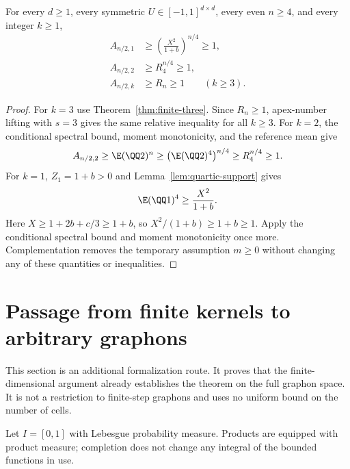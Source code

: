 \begin{theorem}
\label{thm:finite-main}
\proved For every $d\ge1$, every symmetric $U\in[-1,1]^{d\times d}$, every even $n\ge4$,
and every integer $k\ge1$,
\begin{align*}
 A_{n/2,1}&\ge\left(\frac{X^2}{1+b}\right)^{n/4}\ge1,\\
 A_{n/2,2}&\ge R_4^{n/4}\ge1,\\
 A_{n/2,k}&\ge R_n\ge1\qquad(k\ge3).
\end{align*}
\end{theorem}
\begin{proof}
For $k=3$ use Theorem~\ref{thm:finite-three}.  Since $R_n\ge1$, apex-number lifting with
$s=3$ gives the same relative inequality for all $k\ge3$.
For $k=2$, the conditional spectral bound, moment monotonicity, and the reference mean give
\[
 A_{n/2,2}\ge\E(\QQ2)^n
 \ge\bigl(\E(\QQ2)^4\bigr)^{n/4}\ge R_4^{n/4}\ge1.
\]
For $k=1$, $Z_1=1+b>0$ and Lemma~\ref{lem:quartic-support} gives
\[
 \E(\QQ1)^4\ge\frac{X^2}{1+b}.
\]
Here $X\ge1+2b+c/3\ge1+b$, so $X^2/(1+b)\ge1+b\ge1$.
Apply the conditional spectral bound and moment monotonicity once more.
Complementation removes the temporary assumption $m\ge0$ without changing any of these
quantities or inequalities.
\end{proof}

\section{Passage from finite kernels to arbitrary graphons}
\label{sec:approx}

This section is an additional formalization route.  It proves that the finite-dimensional
argument already establishes the theorem on the full graphon space.  It is not a restriction
to finite-step graphons and uses no uniform bound on the number of cells.

Let $I=[0,1]$ with Lebesgue probability measure.  Products are equipped with product
measure; completion does not change any integral of the bounded functions in use.

